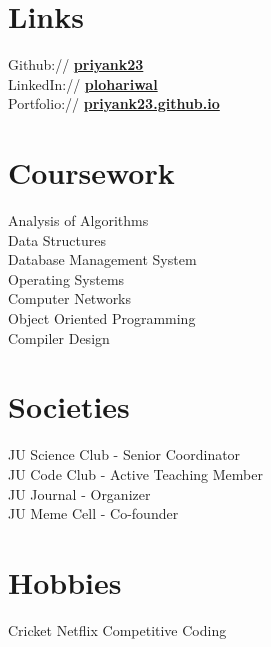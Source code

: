 \documentclass[]{myCV}
\begin{document}
\begin{minipage}[t]{0.33\textwidth}

\section{Links}
Github:// \href{https://github.com/priyank23}{\bf priyank23} \\
LinkedIn://  \href{https://www.linkedin.com/in/plohariwal}{\bf plohariwal} \\
Portfolio:// \href{priyank23.github.io}{\bf priyank23.github.io}
\sectionsep


\section{Coursework}
Analysis of Algorithms \\
Data Structures \\
Database Management System \\
Operating Systems \\
Computer Networks \\
Object Oriented Programming \\
Compiler Design \\
\sectionsep


\section{Societies}
 JU Science Club - Senior Coordinator \\
 JU Code Club - Active Teaching Member \\
 JU Journal - Organizer \\
 JU Meme Cell - Co-founder
\sectionsep

\section{Hobbies}
Cricket \textbullet{} Netflix \textbullet{} Competitive Coding
\sectionsep

\end{minipage}
\end{document}
